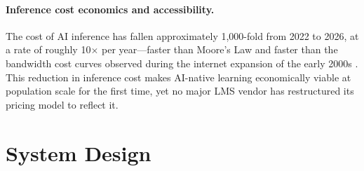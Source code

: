\documentclass[10pt,twocolumn]{article}
\begin{document}
\paragraph{Inference cost economics and accessibility.}
The cost of AI inference has fallen approximately 1,000-fold from 2022
to 2026, at a rate of roughly 10$\times$ per year---faster than
Moore's Law and faster than the bandwidth cost curves observed during
the internet expansion of the early 2000s \cite{a16z2024llmflation}.
This reduction in inference cost makes AI-native learning economically
viable at population scale for the first time, yet no major LMS vendor has
restructured its pricing model to reflect it.

\begin{table}[tbp]
\centering
\caption{Contrast: Sudar + ALP vs.\ \emph{Learn Your Way} and a
typical LMS with AI add-on.}
\label{tab:comparison}
\small
{}
\end{table}

\FloatBarrier

\section{System Design}
\label{sec:design}
\end{document}
